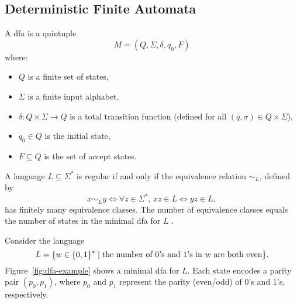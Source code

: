 \subsection{Deterministic Finite Automata}
\label{subsec:dfa}

\begin{definition}
A \gls{dfa} is a quintuple 
\[
M = (Q, \Sigma, \delta, q_0, F)
\]
where:
\begin{itemize}
    \item \( Q \) is a finite set of states,
    \item \( \Sigma \) is a finite input alphabet,
    \item \( \delta: Q \times \Sigma \rightarrow Q \) is a total transition function (defined for all \( (q, \sigma) \in Q \times \Sigma \)),
    \item \( q_0 \in Q \) is the initial state,
    \item \( F \subseteq Q \) is the set of accept states.
\end{itemize}
\end{definition}

\begin{theorem}
    \label{thm:myhill-nerode}
    A language \( L \subseteq \Sigma^* \) is regular if and only if the equivalence relation \( \sim_L \), defined by
    \[
    x \sim_L y \iff \forall z \in \Sigma^*,\, xz \in L \Longleftrightarrow yz \in L,
    \]
    has finitely many equivalence classes. The number of equivalence classes equals the number of states in the minimal \gls{dfa} for \( L \) \cite{sipser2013introduction, myhill1957finite, nerode1958linear}.
\end{theorem}

\begin{example}
Consider the language 
\[
L = \{ w \in \{0,1\}^* \mid \text{the number of 0's and 1's in \( w \) are both even} \}.
\]
Figure~\ref{fig:dfa-example} shows a minimal \gls{dfa} for \( L \). Each state encodes a parity pair \((p_0, p_1)\), where \( p_0 \) and \( p_1 \) represent the parity (even/odd) of 0's and 1's, respectively.
\end{example}

